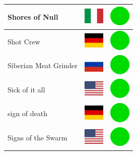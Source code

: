 \documentclass[12pt, a4paper, twoside]{report}
\begin{document}
\begin{center}
\begin{longtable}{|p{5cm}|p{2cm}|p{2cm}|}
Shores of Null & \includegraphics[width=1cm]{4x3/it} & \includegraphics[width=1cm]{likes/y} \\ \hline
Shot Crew & \includegraphics[width=1cm]{4x3/de} & \includegraphics[width=1cm]{likes/y} \\ \hline
Siberian Meat Grinder & \includegraphics[width=1cm]{4x3/ru} & \includegraphics[width=1cm]{likes/y} \\ \hline
Sick of it all & \includegraphics[width=1cm]{4x3/us} & \includegraphics[width=1cm]{likes/y} \\ \hline
sign of death & \includegraphics[width=1cm]{4x3/de} & \includegraphics[width=1cm]{likes/y} \\ \hline
Signs of the Swarm & \includegraphics[width=1cm]{4x3/us} & \includegraphics[width=1cm]{likes/y} \\ \hline

\end{longtable}
\end{center}
\end{document}
